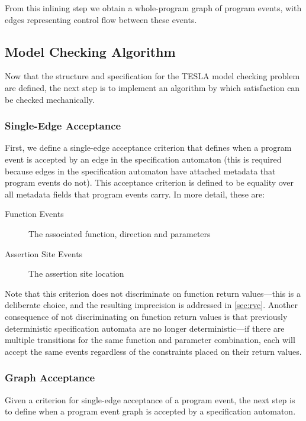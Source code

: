 From this inlining step we obtain a whole-program graph of program events, with
edges representing control flow between these events.

\subsection{Model Checking Algorithm}

Now that the structure and specification for the TESLA model checking problem
are defined, the next step is to implement an algorithm by which satisfaction
can be checked mechanically.

\subsubsection{Single-Edge Acceptance}

First, we define a single-edge acceptance criterion that defines when a program
event is accepted by an edge in the specification automaton (this is required
because edges in the specification automaton have attached metadata that program
events do not). This acceptance criterion is defined to be equality over all
metadata fields that program events carry. In more detail, these are:
\begin{description}
  \item[Function Events] The associated function, direction and parameters
  \item[Assertion Site Events] The assertion site location
\end{description}
Note that this criterion does not discriminate on function return values---this
is a deliberate choice, and the resulting imprecision is addressed in
\autoref{sec:rvc}. Another consequence of not discriminating on function return
values is that previously deterministic specification automata are no longer
deterministic---if there are multiple transitions for the same function and
parameter combination, each will accept the same events regardless of the
constraints placed on their return values.

\subsubsection{Graph Acceptance}

Given a criterion for single-edge acceptance of a program event, the next step
is to define when a program event graph is accepted by a specification
automaton.


